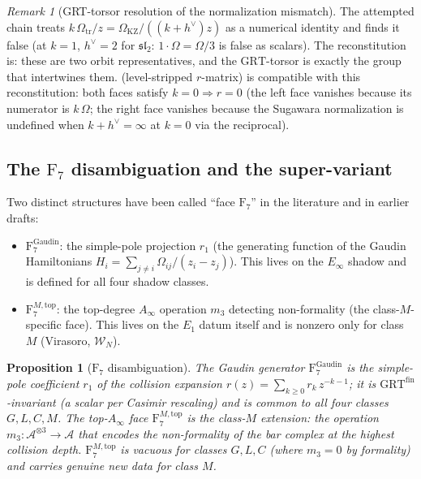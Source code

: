 \documentclass[11pt]{article}
\theoremstyle{plain}
\newtheorem{proposition}[theorem]{Proposition}
\theoremstyle{definition}
\theoremstyle{remark}
\newtheorem{remark}[theorem]{Remark}
\newcommand{\fsl}{\mathfrak{sl}}
\newcommand{\cA}{\mathcal{A}}
\newcommand{\Walg}{\mathcal{W}}
\begin{document}
\begin{remark}[GRT-torsor resolution of the normalization mismatch]
The attempted chain treats
$k\,\Omega_{\mathrm{tr}}/z = \Omega_{\mathrm{KZ}}/((k+h^\vee)z)$ as a numerical identity and
finds it false (at $k=1$, $h^\vee=2$ for $\fsl_2$:
$1\cdot\Omega = \Omega/3$ is false as scalars). The
reconstitution is: these are two orbit representatives, and the
$\mathrm{GRT}$-torsor is exactly the group that intertwines them.
 (level-stripped $r$-matrix) is compatible with this
reconstitution: both faces satisfy $k=0\Rightarrow r=0$ (the
left face vanishes because its numerator is $k\,\Omega$; the
right face vanishes because the Sugawara normalization is
undefined when $k+h^\vee=\infty$ at $k=0$ via the reciprocal).
\end{remark}

\subsection{The $\mathrm{F}_7$ disambiguation and the super-variant}
\label{sec:f7-disambiguation}

Two distinct structures have been called ``face $\mathrm{F}_7$'' in
the literature and in earlier drafts:
\begin{itemize}
 \item $\mathrm{F}_7^{\mathrm{Gaudin}}$: the simple-pole projection
 $r_1$ (the generating function of the Gaudin Hamiltonians
 $H_i = \sum_{j\neq i}\Omega_{ij}/(z_i-z_j)$). This lives on the
 $E_\infty$ shadow and is defined for all four shadow classes.
 \item $\mathrm{F}_7^{M,\mathrm{top}}$: the top-degree $A_\infty$
 operation $m_3$ detecting non-formality (the class-$M$-specific
 face). This lives on the $E_1$ datum itself and is nonzero only
 for class $M$ (Virasoro, $\Walg_N$).
\end{itemize}

\begin{proposition}[$\mathrm{F}_7$ disambiguation]\label{prop:f7-disamb}
The Gaudin generator $\mathrm{F}_7^{\mathrm{Gaudin}}$ is the simple-pole
coefficient $r_1$ of the collision expansion
$r(z) = \sum_{k\geq 0}r_k\,z^{-k-1}$; it is
$\mathrm{GRT}^{\mathrm{fin}}$-invariant (a scalar per Casimir
rescaling) and is common to all four classes $G,L,C,M$. The
top-$A_\infty$ face $\mathrm{F}_7^{M,\mathrm{top}}$ is the class-$M$
extension: the operation $m_3\colon \cA^{\otimes 3}\to\cA$ that
encodes the non-formality of the bar complex at the highest
collision depth. $\mathrm{F}_7^{M,\mathrm{top}}$ is vacuous for
classes $G,L,C$ (where $m_3=0$ by formality) and carries genuine
new data for class $M$.
\end{proposition}
\end{document}
